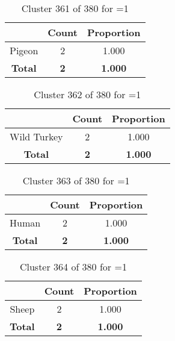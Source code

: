 \begin{table}[ht!]
\centering
\begin{tabular}{|c|c|c|}
\hline
\bf \Spec{} &\bf Count &\bf Proportion\\ \hline \hline
Pigeon & 2 & 1.000\\ \hline
\hline
\bf Total & \bf 2 & \bf 1.000\\ \hline
\end{tabular}
\label{tab:cluster:361:1}
\caption{Cluster 361 of 380 for \minneigh{}=1}
\end{table}

\begin{table}[ht!]
\centering
\begin{tabular}{|c|c|c|}
\hline
\bf \Spec{} &\bf Count &\bf Proportion\\ \hline \hline
Wild Turkey & 2 & 1.000\\ \hline
\hline
\bf Total & \bf 2 & \bf 1.000\\ \hline
\end{tabular}
\label{tab:cluster:362:1}
\caption{Cluster 362 of 380 for \minneigh{}=1}
\end{table}

\begin{table}[ht!]
\centering
\begin{tabular}{|c|c|c|}
\hline
\bf \Spec{} &\bf Count &\bf Proportion\\ \hline \hline
Human & 2 & 1.000\\ \hline
\hline
\bf Total & \bf 2 & \bf 1.000\\ \hline
\end{tabular}
\label{tab:cluster:363:1}
\caption{Cluster 363 of 380 for \minneigh{}=1}
\end{table}

\begin{table}[ht!]
\centering
\begin{tabular}{|c|c|c|}
\hline
\bf \Spec{} &\bf Count &\bf Proportion\\ \hline \hline
Sheep & 2 & 1.000\\ \hline
\hline
\bf Total & \bf 2 & \bf 1.000\\ \hline
\end{tabular}
\label{tab:cluster:364:1}
\caption{Cluster 364 of 380 for \minneigh{}=1}
\end{table}

